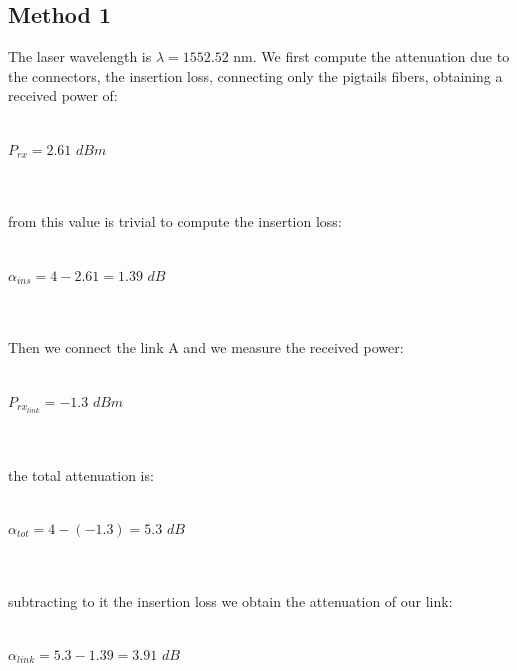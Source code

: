 \documentclass[a4paper,10pt]{report}
\begin{document}
\subsection*{Method 1}
The laser wavelength is $\lambda=1552.52$ nm.
We first compute the attenuation due to the connectors, the insertion loss,
connecting only the pigtails fibers, obtaining a received power of:\\\\
\centerline{$P_{rx} = 2.61 $ $dBm$}\\\\
from this value is trivial to compute the insertion loss:\\\\
\centerline{$\alpha_{ins} = 4 - 2.61 = 1.39 $ $dB$}\\\\
Then we connect the link A and we measure the received power:\\\\ 
\centerline{$P_{rx_{link}} = -1.3 $ $dBm$}\\\\
the total attenuation is:\\\\
\centerline{$\alpha_{tot} = 4 - (-1.3) = 5.3 $ $dB$}\\\\
subtracting to it the insertion loss we obtain the attenuation of our link:\\\\
\centerline{$\alpha_{link} = 5.3 - 1.39 = 3.91 $ $dB$}\\\\
\end{document}
